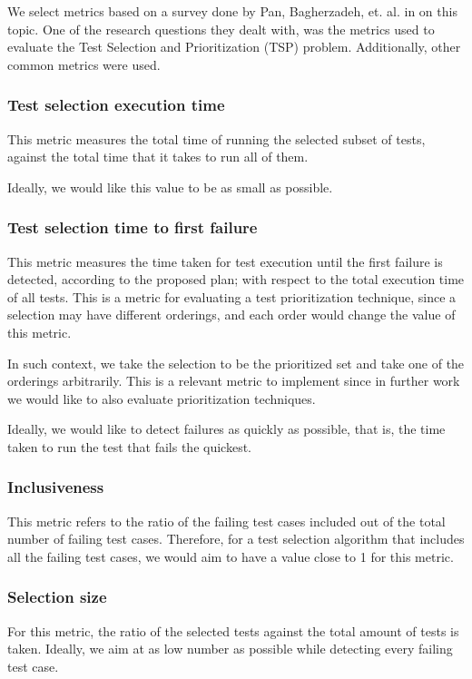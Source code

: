 \documentclass{article}
\begin{document}
We select metrics based on a survey done by Pan, Bagherzadeh, et. al. in \cite{Pan2021TestCS} on this topic. One of the research questions they dealt with, was the metrics used to evaluate the Test Selection and Prioritization (TSP) problem. Additionally, other common metrics were used.

\subsubsection{Test selection execution time}
This metric measures the total time of running the selected subset of tests, against the total time that it takes to run all of them.

Ideally, we would like this value to be as small as possible.
\subsubsection{Test selection time to first failure}\label{section:tffailure}
This metric measures the time taken for test execution until the first failure is detected, according to the proposed plan; with respect to the total execution time of all tests. This is a metric for evaluating a test prioritization technique, since a selection may have different orderings, and each order would change the value of this metric.

In such context, we take the selection to be the prioritized set and take one of the orderings arbitrarily. This is a relevant metric to implement since in further work we would like to also evaluate prioritization techniques.

Ideally, we would like to detect failures as quickly as possible, that is, the time taken to run the test that fails the quickest.
\subsubsection{Inclusiveness}
This metric refers to the ratio of the failing test cases included out of the total number of failing test cases. Therefore, for a test selection algorithm that includes all the failing test cases, we would aim to have a value close to 1 for this metric.
\subsubsection{Selection size}
For this metric, the ratio of the selected tests against the total amount of tests is taken. Ideally, we aim at as low number as possible while detecting every failing test case.
\end{document}
